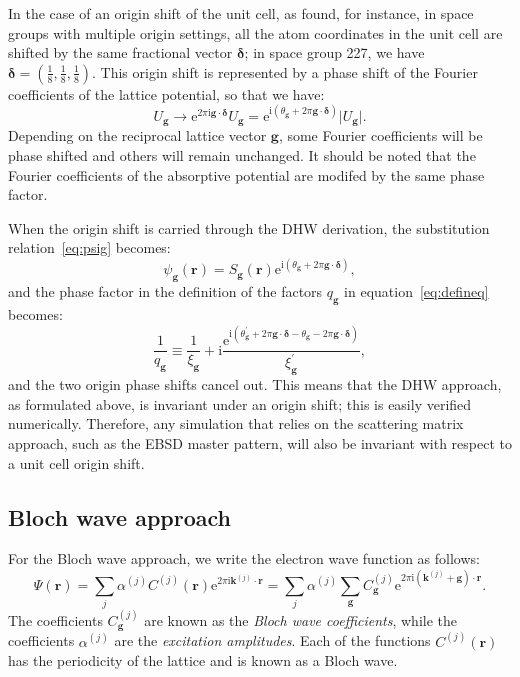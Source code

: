 \documentclass[12pt]{amsart}
\begin{document}
In the case of an origin shift of the unit cell, as found, for instance, in space groups with multiple origin settings, all the atom coordinates in the 
unit cell are shifted by the same fractional vector $\bm{\delta}$; in space group 227, we have $\bm{\delta}=\left(\frac{1}{8},\frac{1}{8},\frac{1}{8}\right)$.
This origin shift is represented by a phase shift of the Fourier coefficients of the lattice potential, so that we have:
\begin{equation}
	U_{\mathbf{g}} \rightarrow \mathrm{e}^{2\pi\mathrm{i}\mathbf{g}\cdot\bm{\delta}} U_{\mathbf{g}} = \mathrm{e}^{\mathrm{i}(\theta_{\mathbf{g}}+2\pi\mathbf{g}\cdot\bm{\delta})} \vert U_{\mathbf{g}}\vert.
\end{equation}
Depending on the reciprocal lattice vector $\mathbf{g}$, some Fourier coefficients will be phase shifted and others will remain unchanged.  It should be noted
that the Fourier coefficients of the absorptive potential are modifed by the same phase factor.

When the origin shift is carried through the DHW derivation, the substitution relation~\ref{eq:psig} becomes:
\begin{equation}
	\psi_\mathbf{g}(\mathbf{r}) = S_{\mathbf{g}}(\mathbf{r}) \mathrm{e}^{\mathrm{i}(\theta_{\mathbf{g}}+2\pi\mathbf{g}\cdot\bm{\delta})},\label{eq:psig2}
\end{equation}
and the phase factor in the definition of the factors $q_{\mathbf{g}}$ in equation~\ref{eq:defineq} becomes:
\begin{equation}
	\frac{1}{q_{\mathbf{g}}} \equiv \frac{1}{\xi_{\mathbf{g}}} + \mathrm{i}
	\frac{\mathrm{e}^{\mathrm{i} (\theta^{\prime}_{\mathbf{g}}+2\pi\mathbf{g}\cdot\bm{\delta} -\theta_{\mathbf{g}}-2\pi\mathbf{g}\cdot\bm{\delta})}}{\xi^{\prime}_{\mathbf{g}}},
	\label{eq:defineq2}
\end{equation}
and the two origin phase shifts cancel out.  This means that the DHW approach, as formulated above, is invariant under an origin shift; this is easily verified numerically.
Therefore, any simulation that relies on the scattering matrix approach, such as the EBSD master pattern, will also be invariant with respect to a unit cell origin shift.

\newcommand{\Cgj}[2]{C_{\mathbf{#1}}^{(#2)}}

\subsection{Bloch wave approach}
For the Bloch wave approach, we write the electron wave function as follows:
\begin{equation}
	\Psi(\mathbf{r})=\sum_j\alpha^{(j)}C^{(j)}(\mathbf{r})\mathrm{e}^{2\pi \mathrm{i}
        \mathbf{k}^{(j)}\cdot\mathbf{r}}=\sum_j\alpha^{(j)}\sum_{\mathbf{g}}\Cgj{g}{j} 
	\mathrm{e}^{2\pi \mathrm{i}(\mathbf{k}^{(j)} +\mathbf{g})\cdot\mathbf{r}}.
	\label{eq:blochexpansion2}
\end{equation}
The coefficients $\Cgj{g}{j}$ are known as the \textit{Bloch wave coefficients}, 
while the coefficients $\alpha^{(j)}$ are the \textit{excitation amplitudes}.
Each of the functions $C^{(j)}(\mathbf{r})$ has the periodicity of the lattice and is
known as a Bloch wave.
\end{document}
